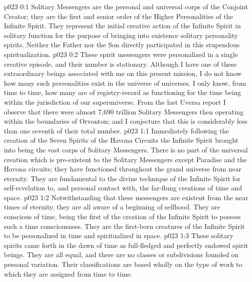 \author{Divine Counsellor}
\vs p023 0:1 Solitary Messengers are the personal and universal corps of the Conjoint Creator; they are the first and senior order of the Higher Personalities of the Infinite Spirit. They represent the initial creative action of the Infinite Spirit in solitary function for the purpose of bringing into existence solitary personality spirits. Neither the Father nor the Son directly participated in this stupendous spiritualization.
\vs p023 0:2 These spirit messengers were personalized in a single creative episode, and their number is stationary. Although I have one of these extraordinary beings associated with me on this present mission, I do not know how many such personalities exist in the universe of universes. I only know, from time to time, how many are of registry\hyp{}record as functioning for the time being within the jurisdiction of our superuniverse. From the last Uversa report I observe that there were almost 7,690 trillion Solitary Messengers then operating within the boundaries of Orvonton; and I conjecture that this is considerably less than one seventh of their total number.
\vs p023 1:1 Immediately following the creation of the Seven Spirits of the Havona Circuits the Infinite Spirit brought into being the vast corps of Solitary Messengers. There is no part of the universal creation which is pre\hyp{}existent to the Solitary Messengers except Paradise and the Havona circuits; they have functioned throughout the grand universe from near eternity. They are fundamental to the divine technique of the Infinite Spirit for self\hyp{}revelation to, and personal contact with, the far\hyp{}flung creations of time and space.
\vs p023 1:2 Notwithstanding that these messengers are existent from the near times of eternity, they are all aware of a beginning of selfhood. They are conscious of time, being the first of the creation of the Infinite Spirit to possess such a time consciousness. They are the first\hyp{}born creatures of the Infinite Spirit to be personalized in time and spiritualized in space.
\vs p023 1:3 These solitary spirits came forth in the dawn of time as full\hyp{}fledged and perfectly endowed spirit beings. They are all equal, and there are no classes or subdivisions founded on personal variation. Their classifications are based wholly on the type of work to which they are assigned from time to time.
